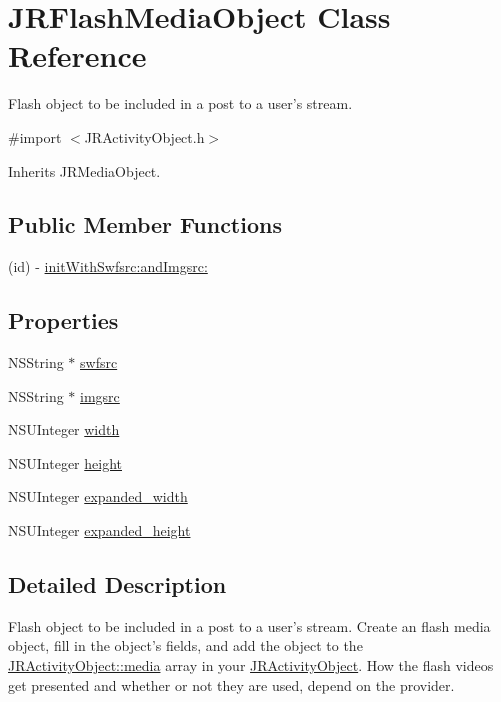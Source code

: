 \hypertarget{interface_j_r_flash_media_object}{
\section{JRFlashMediaObject Class Reference}
\label{interface_j_r_flash_media_object}
}


Flash object to be included in a post to a user's stream.  




{\ttfamily \#import $<$JRActivityObject.h$>$}



Inherits JRMediaObject.

\subsection*{Public Member Functions}
\begin{DoxyCompactItemize}
\item 
(id) -\/ \hyperlink{interface_j_r_flash_media_object_aed4ac7b682373f36379eb81dea041513}{initWithSwfsrc:andImgsrc:}
\end{DoxyCompactItemize}
\subsection*{Properties}
\begin{DoxyCompactItemize}
\item 
NSString $\ast$ \hyperlink{interface_j_r_flash_media_object_a5a79b3d8071ac0286b3ee60e9e0138d0}{swfsrc}
\item 
NSString $\ast$ \hyperlink{interface_j_r_flash_media_object_a5a26cacd216012b37900445a8161ac56}{imgsrc}
\item 
NSUInteger \hyperlink{interface_j_r_flash_media_object_aaeb77e697438b7aa6e44f52bea0ed9c2}{width}
\item 
NSUInteger \hyperlink{interface_j_r_flash_media_object_a0689e19fdf6cb9d3911878a95d6ebcc9}{height}
\item 
NSUInteger \hyperlink{interface_j_r_flash_media_object_a9c380d0410afa60d99442f4ab84b517c}{expanded\_\-width}
\item 
NSUInteger \hyperlink{interface_j_r_flash_media_object_ae390a89405d768f2fcc63c24a8271503}{expanded\_\-height}
\end{DoxyCompactItemize}


\subsection{Detailed Description}
Flash object to be included in a post to a user's stream. Create an flash media object, fill in the object's fields, and add the object to the \hyperlink{interface_j_r_activity_object_a2e4ff78f83d0f353f8e0c17ed48ce0ab}{JRActivityObject::media} array in your \hyperlink{interface_j_r_activity_object}{JRActivityObject}. How the flash videos get presented and whether or not they are used, depend on the provider.

